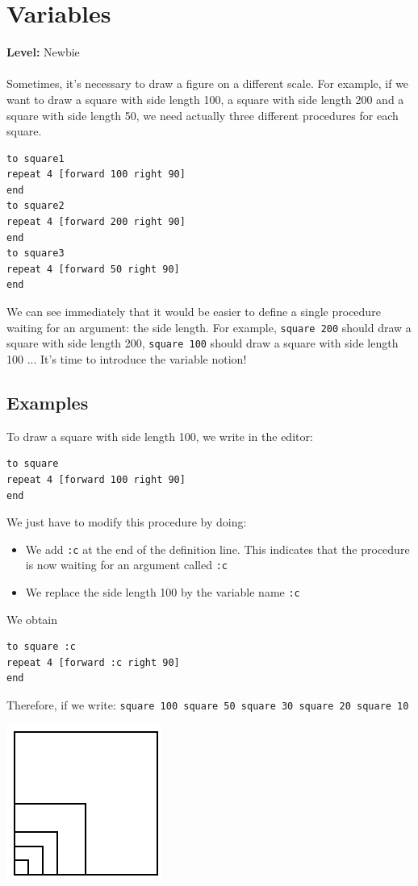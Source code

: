 \chapter{Variables}
{ }\hfill\textbf{Level:} Newbie\\ \\
\noindent Sometimes, it's necessary to draw a figure on a different scale. For example, if we want to draw a square with side length 100, a square with side length 200 and a square with side length 50, we need actually three different procedures  for each square.
\begin{verbatim}
to square1
repeat 4 [forward 100 right 90]
end
to square2
repeat 4 [forward 200 right 90]
end
to square3
repeat 4 [forward 50 right 90]
end
\end{verbatim}
We can see immediately that it would be easier to define a single procedure waiting for an argument: the side length. For example, \texttt{square 200} should draw a square with side length 200, \texttt{square 100} should draw a square with side length 100 ... It's time to introduce the variable notion!
\section{Examples}
\noindent To draw a square with side length 100, we write in the editor:
\begin{verbatim}
to square
repeat 4 [forward 100 right 90]
end
\end{verbatim}  
We just have to modify this procedure by doing:
\begin{itemize}
 \item We add \texttt{:c} at the end of the definition line. This indicates that the procedure is now waiting for an argument called \texttt{:c}
 \item We replace the side length 100 by the variable name \texttt{:c}
\end{itemize}
We obtain
\begin{verbatim}
to square :c
repeat 4 [forward :c right 90]
end
\end{verbatim}
Therefore, if we write: \texttt{square 100 square 50 square 30 square 20 square 10}\\
 \begin{center}
\includegraphics[scale=0.5]{pics/variables-carres.png}
\end{center}
 \vspace{1cm}
